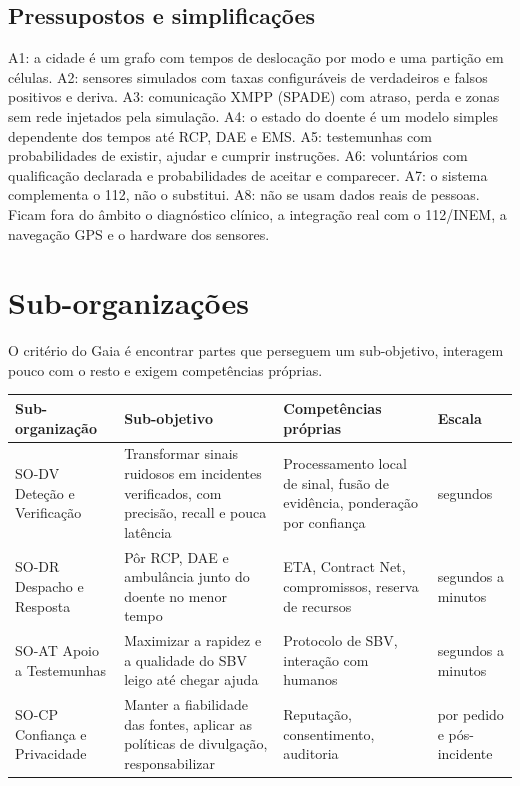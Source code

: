 \documentclass[10pt,a4paper]{article}
\begin{document}
\subsection{Pressupostos e simplificações}\label{sec:pressupostos}

A1: a cidade é um grafo com tempos de deslocação por modo e uma partição em células. A2: sensores simulados com taxas configuráveis de verdadeiros e falsos positivos e deriva. A3: comunicação XMPP (SPADE) com atraso, perda e zonas sem rede injetados pela simulação. A4: o estado do doente é um modelo simples dependente dos tempos até RCP, DAE e EMS. A5: testemunhas com probabilidades de existir, ajudar e cumprir instruções. A6: voluntários com qualificação declarada e probabilidades de aceitar e comparecer. A7: o sistema complementa o 112, não o substitui. A8: não se usam dados reais de pessoas. Ficam fora do âmbito o diagnóstico clínico, a integração real com o 112/INEM, a navegação GPS e o hardware dos sensores.

\section{Sub-organizações}\label{sec:suborg}

O critério do Gaia é encontrar partes que perseguem um sub-objetivo, interagem pouco com o resto e exigem competências próprias.

\noindent\begin{tabularx}{\linewidth}{@{}P{2.6cm}LLl@{}}
\toprule
Sub-organização & Sub-objetivo & Competências próprias & Escala \\
\midrule
SO-DV Deteção e Verificação & Transformar sinais ruidosos em incidentes verificados, com precisão, recall e pouca latência & Processamento local de sinal, fusão de evidência, ponderação por confiança & segundos \\
SO-DR Despacho e Resposta & Pôr RCP, DAE e ambulância junto do doente no menor tempo & ETA, Contract Net, compromissos, reserva de recursos & segundos a minutos \\
SO-AT Apoio a Testemunhas & Maximizar a rapidez e a qualidade do SBV leigo até chegar ajuda & Protocolo de SBV, interação com humanos & segundos a minutos \\
SO-CP Confiança e Privacidade & Manter a fiabilidade das fontes, aplicar as políticas de divulgação, responsabilizar & Reputação, consentimento, auditoria & por pedido e pós-incidente \\
\bottomrule
\end{tabularx}
\end{document}
